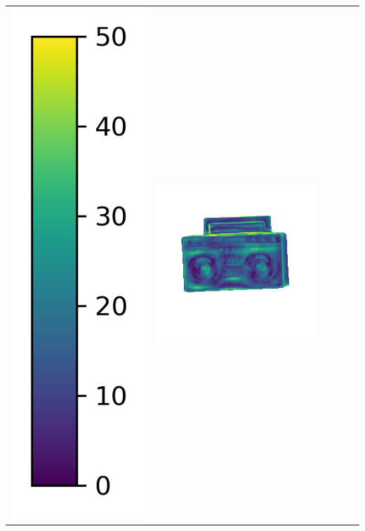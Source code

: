 \begin{center}
\begin{tabularx}{\linewidth}{@{}Y@{}Y@{}Y@{}Y@{}Y@{}Y@{}}
\includegraphics[width=0.2\linewidth]{semisynthetic/colorbar_error_vertical.png} &
\includegraphics[width=\linewidth]{semisynthetic/20150514_19_ours_err.png} &

\end{tabularx}
\end{center}
